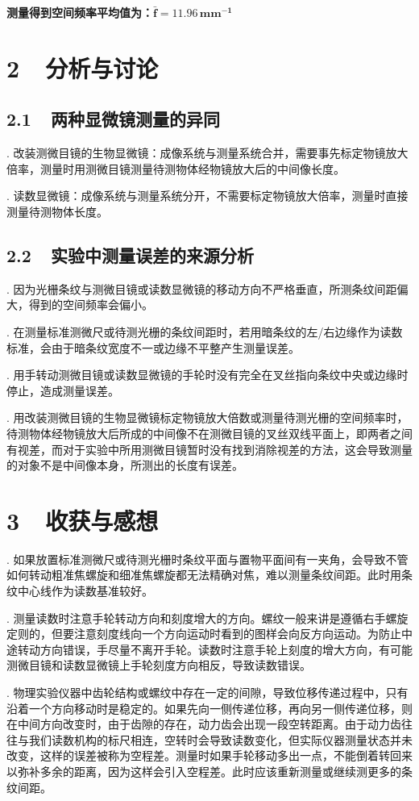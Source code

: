 \documentclass{ctexbook}
\begin{document}
\noindent \textbf{测量得到空间频率平均值为：}$\bm{\bar{f} = 11.96}\,\mathbf{mm^{-1}}$

\newpage
\section*{ 2\ \ 分析与讨论}
\bigskip

\subsection*{ 2.1\ \ 两种显微镜测量的异同}

. 改装测微目镜的生物显微镜：成像系统与测量系统合并，需要事先标定物镜放大倍率，测量时用测微目镜测量待测物体经物镜放大后的中间像长度。
\medskip

. 读数显微镜：成像系统与测量系统分开，不需要标定物镜放大倍率，测量时直接测量待测物体长度。

\bigskip
\subsection*{ 2.2\ \ 实验中测量误差的来源分析}

. 因为光栅条纹与测微目镜或读数显微镜的移动方向不严格垂直，所测条纹间距偏大，得到的空间频率会偏小。
\medskip

. 在测量标准测微尺或待测光栅的条纹间距时，若用暗条纹的左/右边缘作为读数标准，会由于暗条纹宽度不一或边缘不平整产生测量误差。
\medskip

. 用手转动测微目镜或读数显微镜的手轮时没有完全在叉丝指向条纹中央或边缘时停止，造成测量误差。
\medskip

. 用改装测微目镜的生物显微镜标定物镜放大倍数或测量待测光栅的空间频率时，待测物体经物镜放大后所成的中间像不在测微目镜的叉丝双线平面上，即两者之间有视差，而对于实验中所用测微目镜暂时没有找到消除视差的方法，这会导致测量的对象不是中间像本身，所测出的长度有误差。

\newpage
\section*{ 3\ \ 收获与感想}
\bigskip

. 如果放置标准测微尺或待测光栅时条纹平面与置物平面间有一夹角，会导致不管如何转动粗准焦螺旋和细准焦螺旋都无法精确对焦，难以测量条纹间距。此时用条纹中心线作为读数基准较好。
\medskip

. 测量读数时注意手轮转动方向和刻度增大的方向。螺纹一般来讲是遵循右手螺旋定则的，但要注意刻度线向一个方向运动时看到的图样会向反方向运动。为防止中途转动方向错误，手尽量不离开手轮。读数时注意手轮上刻度的增大方向，有可能测微目镜和读数显微镜上手轮刻度方向相反，导致读数错误。
\medskip

. 物理实验仪器中齿轮结构或螺纹中存在一定的间隙，导致位移传递过程中，只有沿着一个方向移动时是稳定的。如果先向一侧传递位移，再向另一侧传递位移，则在中间方向改变时，由于齿隙的存在，动力齿会出现一段空转距离。由于动力齿往往与我们读数机构的标尺相连，空转时会导致读数变化，但实际仪器测量状态并未改变，这样的误差被称为空程差。测量时如果手轮移动多出一点，不能倒着转回来以弥补多余的距离，因为这样会引入空程差。此时应该重新测量或继续测更多的条纹间距。
\end{document}
